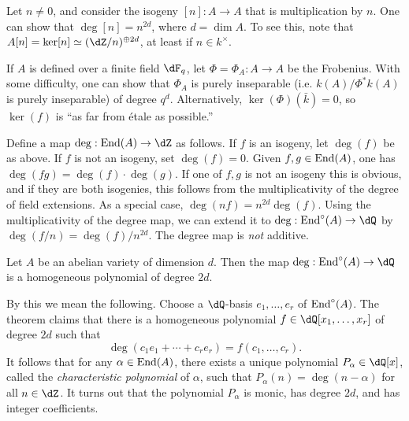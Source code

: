\begin{example}
Let $n\ne 0$, and consider the isogeny $[n]:A\to A$ that is multiplication by 
$n$. One can show that $\deg[n]=n^{2 d}$, where $d=\dim A$. To see this,  note 
that $A[n]=\ker[n]\simeq (\dZ/n)^{\oplus 2 d}$, at least if $n\in k^\times$. 
\end{example}

\begin{example}
If $A$ is defined over a finite field $\dF_q$, let $\Phi=\Phi_A:A\to A$ be the 
Frobenius. With some difficulty, one can show that $\Phi_A$ is purely 
inseparable (i.e. $k(A)/\Phi^\ast k(A)$ is purely inseparable) of degree 
$q^d$. Alternatively, $\ker(\Phi)(\bar k)=0$, so $\ker(f)$ is ``as far from 
\'etale as possible.'' 
\end{example}

Define a map $\deg:\End(A) \to \dZ$ as follows. If $f$ is an isogeny, let 
$\deg(f)$  be as above. If $f$ is not an isogeny, set $\deg(f)=0$. Given 
$f,g\in \operatorname{End}(A)$, one has $\deg(f g)=\deg(f)\cdot \deg(g)$. If one of $f,g$ is 
not an isogeny this is obvious, and if they are both isogenies, this follows 
from the multiplicativity of the degree of field extensions. As a special case, 
$\deg(n f)=n^{2 d}\deg(f)$. Using the multiplicativity of the degree map, we 
can extend it to $\deg:\End^\circ(A)\to \dQ$ by $\deg(f/n) = \deg(f)/n^{2 d}$. 
The degree map is \emph{not} additive. 

\begin{theorem}
Let $A$ be an abelian variety of dimension $d$. Then the map 
$\deg:\End^\circ(A) \to \dQ$ is a homogeneous polynomial of degree $2 d$. 
\end{theorem}

By this we mean the following. Choose a $\dQ$-basis $e_1,\dots,e_r$ of 
$\operatorname{End}^\circ(A)$. The theorem claims that there is a homogeneous polynomial 
$f\in \dQ[x_1,\dots,x_r]$ of degree $2 d$ such that 
\[
  \deg\left(c_1 e_1 + \cdots + c_r e_r\right) = f(c_1,\dots,c_r) \text{.}
\]
It follows that for any $\alpha\in \operatorname{End}(A)$, there exists a unique polynomial 
$P_\alpha\in \dQ[x]$, called the \emph{characteristic polynomial} of $\alpha$, 
such that $P_\alpha(n) = \deg(n-\alpha)$ for all $n\in \dZ$. It turns out that 
the polynomial $P_\alpha$ is monic, has degree $2 d$, and has integer 
coefficients. 

